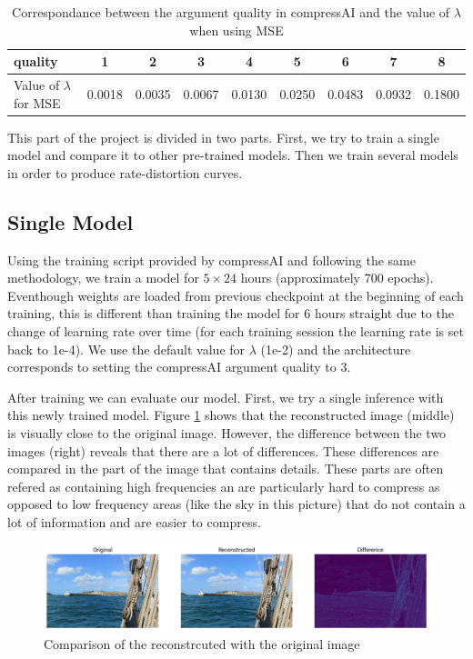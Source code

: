 \begin{table}[]
    \centering
    \begin{tabular}{|l|c|c|c|c|c|c|c|c|}
    \hline
    \textsf{quality}                      & 1 & 2 & 3 & 4 & 5 & 6 & 7 & 8 \\ \hline
    Value of \(\lambda\) for MSE & 0.0018 & 0.0035 & 0.0067 & 0.0130 & 0.0250 & 0.0483 & 0.0932 & 0.1800 \\ \hline
    \end{tabular}
    \caption{Correspondance between the argument \textsf{quality} in compressAI and the value of \(\lambda\) when using MSE}
    \label{tab}
\end{table}

This part of the project is divided in two parts. First, we try to train a single model and compare it to other pre-trained models. Then we train several models in order to produce rate-distortion curves.

\subsection{Single Model}
Using the training script provided by compressAI and following the same methodology, we train a model for \(5 \times 24\) hours (approximately 700 epochs). Eventhough weights are loaded from previous checkpoint at the beginning of each training, this is different than training the model for 6 hours straight due to the change of learning rate over time (for each training session the learning rate is set back to 1e-4). We use the default value for \(\lambda\) (1e-2) and the architecture corresponds to setting the compressAI argument \textsf{quality} to 3.

After training we can evaluate our model. First, we try a single inference with this newly trained model. Figure \ref{balle_repro_1} shows that the reconstructed image (middle) is visually close to the original image. However, the difference between the two images (right) reveals that there are a lot of differences. These differences are compared in the part of the image that contains details. These parts are often refered as containing high frequencies an are particularly hard to compress as opposed to low frequency areas (like the sky in this picture) that do not contain a lot of information and are easier to compress.

\begin{figure}
    \centering
    \includegraphics[width=15cm]{img/balle_repro_1.png}
    \caption{Comparison of the reconstrcuted with the original image}
    \label{balle_repro_1}
\end{figure}

